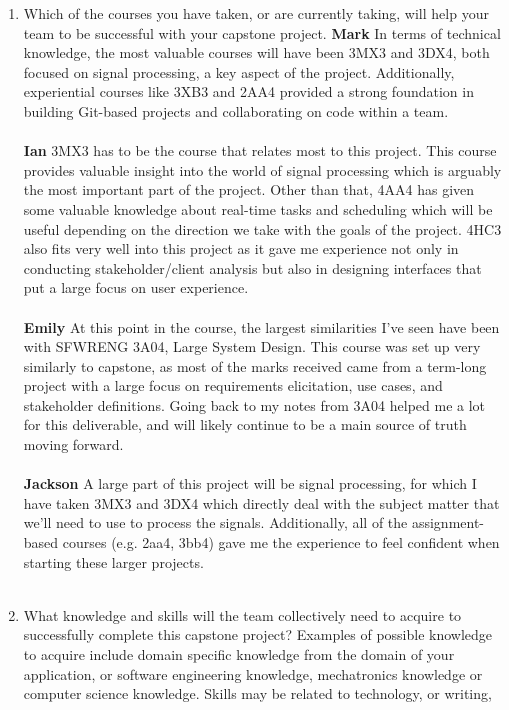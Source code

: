 \begin{enumerate}
  \item Which of the courses you have taken, or are currently taking, will help
  your team to be successful with your capstone project.
  \textbf{Mark} In terms of technical knowledge, the most valuable courses will have been 3MX3 and 3DX4, both focused on signal processing, a key aspect of the project. Additionally, experiential courses like 3XB3 and 2AA4 provided a strong foundation in building Git-based projects and collaborating on code within a team. \\ \\
  \textbf{Ian} 3MX3 has to be the course that relates most to this project. This course provides valuable insight into the world of signal processing which is arguably the most important part of the project. Other than that, 4AA4 has given some valuable knowledge about real-time tasks and scheduling which will be useful depending on the direction we take with the goals of the project. 4HC3 also fits very well into this project as it gave me experience not only in conducting stakeholder/client analysis but also in designing interfaces that put a large focus on user experience. \\ \\
  \textbf{Emily} At this point in the course, the largest similarities I’ve seen have been with SFWRENG 3A04, Large System Design. This course was set up very similarly to capstone, as most of the marks received came from a term-long project with a large focus on requirements elicitation, use cases, and stakeholder definitions. Going back to my notes from 3A04 helped me a lot for this deliverable, and will likely continue to be a main source of truth moving forward.\\ \\
  \textbf{Jackson} A large part of this project will be signal processing, for which I have taken 3MX3 and 3DX4 which directly deal with the subject matter that we’ll need to use to process the signals. Additionally, all of the assignment-based courses (e.g. 2aa4, 3bb4) gave me the experience to feel confident when starting these larger projects. \\ \\
  \item What knowledge and skills will the team collectively need to acquire to
  successfully complete this capstone project?  Examples of possible knowledge
  to acquire include domain specific knowledge from the domain of your
  application, or software engineering knowledge, mechatronics knowledge or
  computer science knowledge.  Skills may be related to technology, or writing,

\end{enumerate}
